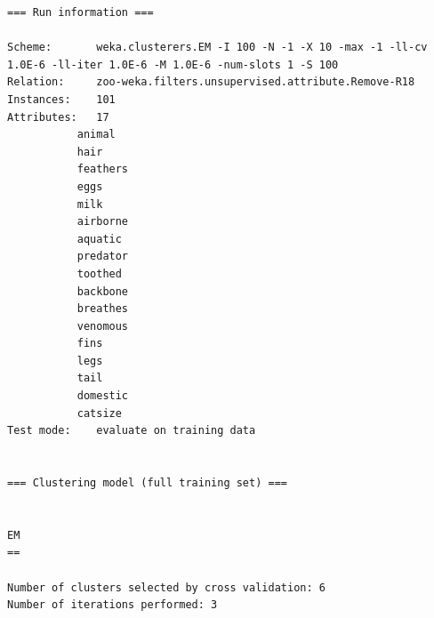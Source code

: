 \documentclass[11pt,a4paper]{article}
\begin{document}
\begin{verbatim}
=== Run information ===

Scheme:       weka.clusterers.EM -I 100 -N -1 -X 10 -max -1 -ll-cv 1.0E-6 -ll-iter 1.0E-6 -M 1.0E-6 -num-slots 1 -S 100
Relation:     zoo-weka.filters.unsupervised.attribute.Remove-R18
Instances:    101
Attributes:   17
           animal
           hair
           feathers
           eggs
           milk
           airborne
           aquatic
           predator
           toothed
           backbone
           breathes
           venomous
           fins
           legs
           tail
           domestic
           catsize
Test mode:    evaluate on training data


=== Clustering model (full training set) ===


EM
==

Number of clusters selected by cross validation: 6
Number of iterations performed: 3



\end{verbatim}
\end{document}
